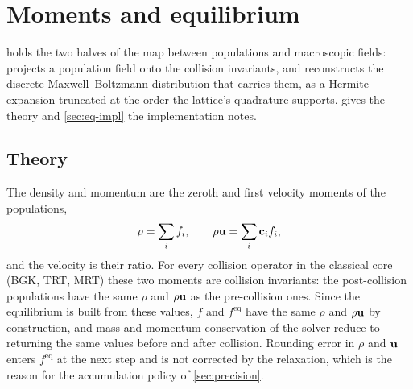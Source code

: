 
\chapter{Moments and equilibrium}

\label{Chapter4}

 holds the two halves of the map between populations and
macroscopic fields:  projects a population field onto the collision
invariants, and  reconstructs the discrete Maxwell--Boltzmann
distribution that carries them, as a Hermite expansion truncated at the order the lattice's
quadrature supports.  gives the theory and \cref{sec:eq-impl} the
implementation notes.


\section{Theory}\label{sec:eq-theory}

The density and momentum are the zeroth and first velocity moments of the populations,
\begin{equation}
\rho = \sum_i f_i, \qquad \rho\mathbf{u} = \sum_i \mathbf{c}_i f_i,
\label{eq:moments}
\end{equation}
and the velocity is their ratio. For every collision operator in the classical core (BGK,
TRT, MRT) these two moments are collision invariants: the post-collision populations have
the same $\rho$ and $\rho\mathbf{u}$ as the pre-collision ones. Since the equilibrium is built from
these values, $f$ and $f^{\mathrm{eq}}$ have the same $\rho$ and $\rho\mathbf{u}$ by construction,
and mass and momentum conservation of the solver reduce to  returning the
same values before and after collision. Rounding error in $\rho$ and $\mathbf{u}$ enters
$f^{\mathrm{eq}}$ at the next step and is not corrected by the relaxation, which is the
reason for the accumulation policy of \cref{sec:precision}.

